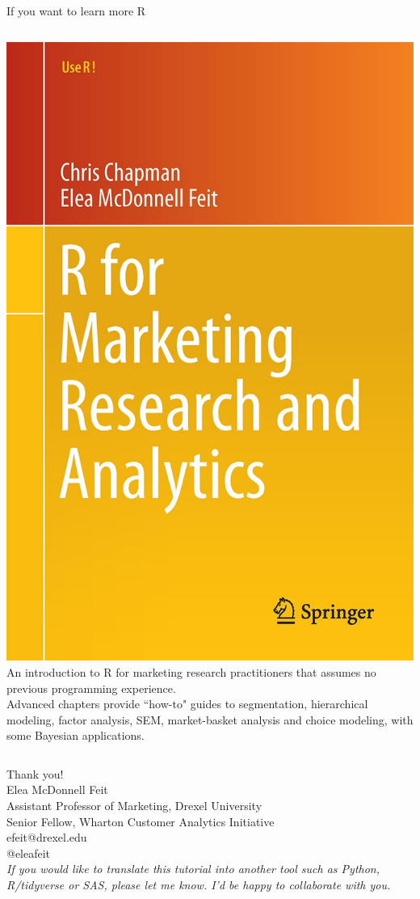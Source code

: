\documentclass[10pt, aspectratio=169]{beamer}
\begin{document}
\begin{frame}{If you want to learn more R}
\begin{columns}[T]
\includegraphics[height=0.8\textheight]{images/Chapman_and_Feit_Cover.jpg}
An introduction to R for marketing research practitioners that assumes no previous programming experience. \\
\bigskip
Advanced chapters provide ``how-to" guides to segmentation, hierarchical modeling, factor analysis, SEM, market-basket analysis and choice modeling, with some Bayesian applications. \\
\end{columns}
\end{frame}

\begin{frame}{}
\flushright
\alert{Thank you!}\\
Elea McDonnell Feit\\
Assistant Professor of Marketing, Drexel University\\
Senior Fellow, Wharton Customer Analytics Initiative\\
efeit@drexel.edu\\
@eleafeit\\
\bigskip
\bigskip
\flushleft
\footnotesize 
\emph{If you would like to translate this tutorial into another tool such as Python, R/tidyverse or SAS, please let me know.  I'd be happy to collaborate with you.}
\end{frame}

{

}
\end{document}
